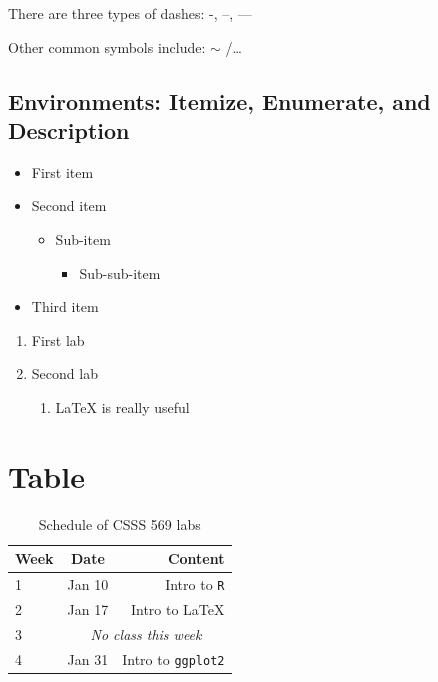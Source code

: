 \documentclass[12pt, a4paper]{article}
\begin{document}
There are three types of dashes: -, --, --- 

Other common symbols include:  $\sim$ \slash \dots 

\subsection{Environments: Itemize, Enumerate, and Description}
\begin{itemize}
    \item First item
    \item Second item
        \begin{itemize}
        \item Sub-item
            \begin{itemize}
            \item Sub-sub-item
            \end{itemize}
        \end{itemize}
    \item Third item
\end{itemize}

\smallskip

\begin{enumerate}
    \item First lab
    \item Second lab
    \begin{enumerate}
        \item \LaTeX{} is really useful
    \end{enumerate}
\end{enumerate}

\section{Table}

\begin{table}[h]
    \begin{center}
        \begin{tabular}{l c r}
        Week & Date & Content \\
        \hline
        1  & Jan 10 & Intro to \texttt{R} \\
        2  & Jan 17 & Intro to \LaTeX{} \\
        3 & \multicolumn{2}{c}{\textit{No class this week}} \\
        4 & Jan 31 & Intro to \texttt{ggplot2} \\
        \end{tabular}
    \end{center}
\caption{Schedule of CSSS 569 labs}
\label{tab:schedule}
\end{table}
\end{document}
